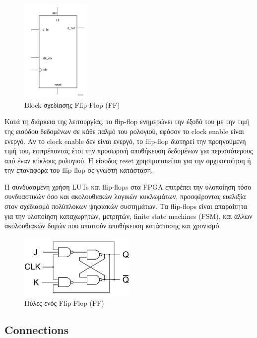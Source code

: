\begin{figure}[h!]
  \centering
  \includegraphics[width=0.3\textwidth]{figures/chapter3/flip_flop_schema.png}
  \caption{Block σχεδίασης Flip-Flop (FF)}
  \label{fig:flipflop_schema}
\end{figure}

Κατά τη διάρκεια της λειτουργίας, το flip-flop ενημερώνει την έξοδό του με την τιμή της εισόδου δεδομένων σε κάθε παλμό του ρολογιού, εφόσον το clock enable είναι ενεργό. Αν το clock enable δεν είναι ενεργό, το flip-flop διατηρεί την προηγούμενη τιμή του, επιτρέποντας έτσι την προσωρινή αποθήκευση δεδομένων για περισσότερους από έναν κύκλους ρολογιού. Η είσοδος reset χρησιμοποιείται για την αρχικοποίηση ή την επαναφορά του flip-flop σε γνωστή κατάσταση.

Η συνδυασμένη χρήση LUTs και flip-flops στα FPGA επιτρέπει την υλοποίηση τόσο συνδυαστικών όσο και ακολουθιακών λογικών κυκλωμάτων, προσφέροντας ευελιξία στον σχεδιασμό πολύπλοκων ψηφιακών συστημάτων. Τα flip-flops είναι απαραίτητα για την υλοποίηση καταχωρητών, μετρητών, finite state machines (FSM), και άλλων ακολουθιακών δομών που απαιτούν αποθήκευση κατάστασης και χρονισμό.

\begin{figure}[h!]
  \centering
  \includegraphics[width=0.5\textwidth]{figures/chapter3/flip_flop_fpga.png}
  \caption{Πύλες ενός Flip-Flop (FF)}
  \label{fig:flipflop_diagram}
\end{figure}

\subsection{Connections}

